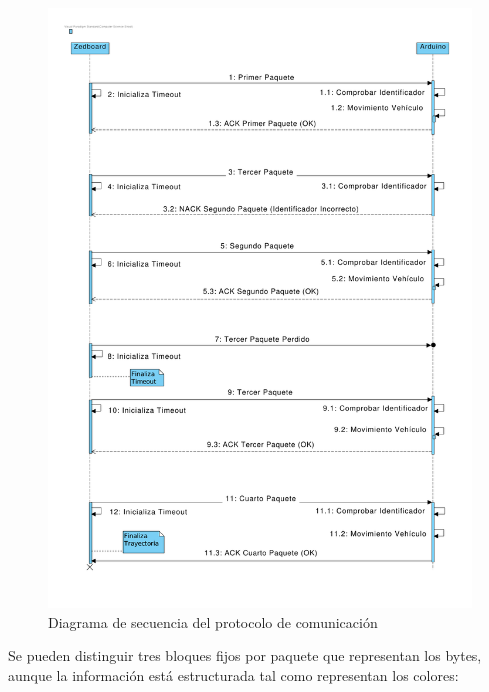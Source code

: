 \begin{figure}[hbtp]
\centering
	\includegraphics[width=1\textwidth]{./figures/DiagramaSecuencia.pdf}
	\caption{Diagrama de secuencia del protocolo de comunicación}
	\label{fig:DiagramaSecuencia}
\end{figure}

Se pueden distinguir tres bloques fijos por paquete que representan los bytes, aunque la información está estructurada tal como representan los colores:

